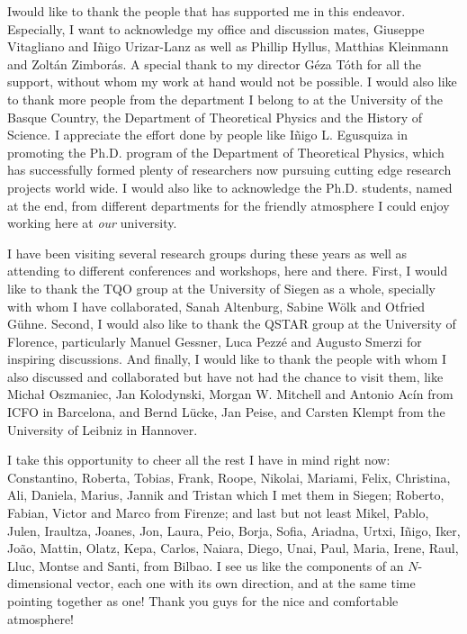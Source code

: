 \documentclass[12pt, letterpaper, twoside]{article}
\numberwithin{equation}{section}
\numberwithin{figure}{section}
\numberwithin{table}{section}
\begin{document}
\lettrine[lines=2, findent=3pt,nindent=0pt]{I}{}would like to thank the people that has supported me in this endeavor.
Especially, I want to acknowledge my office and discussion mates, Giuseppe Vitagliano and Iñigo Urizar-Lanz as well as Phillip Hyllus, Matthias Kleinmann and Zoltán Zimborás.
A special thank to my director Géza Tóth for all the support, without whom my work at hand would not be possible.
I would also like to thank more people from the department I belong to at the University of the Basque Country, the Department of Theoretical Physics and the History of Science.
I appreciate the effort done by people like Iñigo L. Egusquiza in promoting the Ph.D. program of the Department of Theoretical Physics, which has successfully formed plenty of researchers now pursuing cutting edge research projects world wide.
I would also like to acknowledge the Ph.D. students, named at the end, from different departments for the friendly atmosphere I could enjoy working here at \emph{our} university.

I have been visiting several research groups during these years as well as attending to different conferences and workshops, here and there.
First, I would like to thank the TQO group at the University of Siegen as a whole, specially with whom I have collaborated, Sanah Altenburg, Sabine Wölk and Otfried Gühne.
Second, I would also like to thank the QSTAR group at the University of Florence, particularly Manuel Gessner, Luca Pezz\'e and Augusto Smerzi for inspiring discussions.
And finally, I would like to thank the people with whom I also discussed and collaborated but have not had the chance to visit them, like Micha{\l} Oszmaniec, Jan Kolodynski, Morgan W. Mitchell and Antonio Acín from ICFO in Barcelona, and Bernd L\"ucke, Jan Peise, and Carsten Klempt from the University of Leibniz in Hannover.

I take this opportunity to cheer all the rest I have in mind right now: Constantino, Roberta, Tobias, Frank, Roope, Nikolai, Mariami, Felix, Christina, Ali, Daniela, Marius, Jannik and Tristan which I met them in Siegen; Roberto, Fabian, Victor and Marco from Firenze; and last but not least Mikel, Pablo, Julen, Iraultza, Joanes, Jon, Laura, Peio, Borja, Sofia, Ariadna, Urtxi, Iñigo, Iker, Jo\~ao, Mattin, Olatz, Kepa, Carlos, Naiara, Diego, Unai, Paul, Maria, Irene, Raul, Lluc, Montse and Santi, from Bilbao.
I see us like the components of an $N$-dimensional vector, each one with its own direction, and at the same time pointing together as one!
Thank you guys for the nice and comfortable atmosphere!
\end{document}
